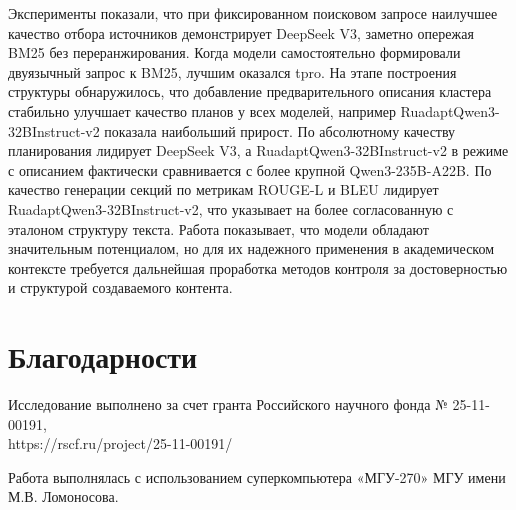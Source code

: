 \documentclass{article}
\begin{document}
Эксперименты показали, что при фиксированном поисковом запросе наилучшее качество отбора источников демонстрирует DeepSeek V3, 
заметно опережая BM25 без переранжирования. Когда модели самостоятельно формировали двуязычный запрос к BM25, лучшим оказался tpro.
На этапе построения структуры обнаружилось, что добавление предварительного описания кластера стабильно улучшает качество планов у всех моделей, например RuadaptQwen3-\allowbreak 32BInstruct-v2 показала наибольший прирост. 
По абсолютному качеству планирования лидирует DeepSeek V3, а RuadaptQwen3-\allowbreak 32BInstruct-v2 в режиме с описанием фактически сравнивается с более крупной Qwen3-\allowbreak 235B-\allowbreak A22B.
По качество генерации секций по метрикам ROUGE-L и BLEU лидирует RuadaptQwen3-\allowbreak 32BInstruct-v2, что указывает на более согласованную с эталоном структуру текста.
Работа показывает, что модели обладают значительным потенциалом, 
но для их надежного применения в академическом контексте требуется дальнейшая проработка методов контроля за достоверностью и структурой создаваемого контента.

\section*{Благодарности}
Исследование выполнено за счет гранта Российского научного фонда № 25-11-00191, \\https://rscf.ru/project/25-11-00191/

Работа выполнялась с использованием суперкомпьютера «МГУ-270» МГУ имени М.В. Ломоносова.
\end{document}
